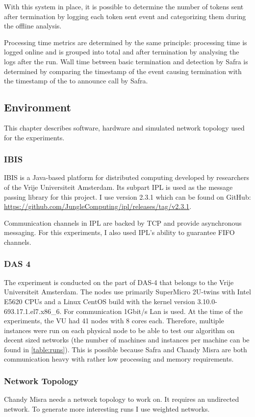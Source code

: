 With this system in place, it is possible to determine the number of tokens sent after termination by logging each token sent event and categorizing them during the offline analysis.

Processing time metrics are determined by the same principle: processing time is logged online and is grouped into total and after termination by analysing the logs after the run.
Wall time between basic termination and detection by Safra is determined by comparing the timestamp of the event causing termination with the timestamp of the to announce call by Safra.

\subsection{Environment}
This chapter describes software, hardware and simulated network topology used for the experiments.
\subsubsection{IBIS}
IBIS is a Java-based platform for distributed computing developed by researchers of the Vrije Universiteit Amsterdam. 
Its subpart IPL is used as the message passing library for this project. 
I use version 2.3.1 which can be found on GitHub: \href{https://github.com/JungleComputing/ipl/releases/tag/v2.3.1}{https://github.com/JungleComputing/ipl/releases/tag/v2.3.1}.

Communication channels in IPL are backed by TCP and provide asynchronous messaging.
For this experiments, I also used IPL's ability to guarantee FIFO channels.
\subsubsection{DAS 4}
The experiment is conducted on the part of DAS-4 that belongs to the Vrije Universiteit Amsterdam. 
The nodes use primarily SuperMicro 2U-twins with Intel E5620 CPUs and a Linux CentOS build with the kernel version 3.10.0-693.17.1.el7.x86\_6.
For communication 1Gbit/s Lan is used.
At the time of the experiments, the VU had 41 nodes with 8 cores each.
Therefore, multiple instances were run on each physical node to be able to test our algorithm on decent sized networks (the number of machines and instances per machine can be found in \cref{table:runs}).
This is possible because Safra and Chandy Misra are both communication heavy with rather low processing and memory requirements.

\subsubsection{Network Topology}
Chandy Misra needs a network topology to work on. 
It requires an undirected network.
To generate more interesting runs I use weighted networks.

